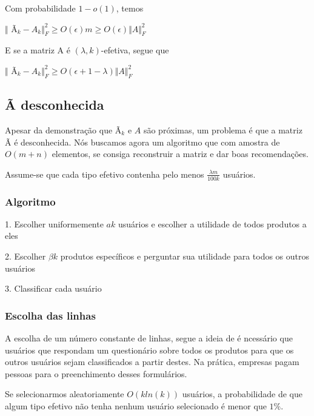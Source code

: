 \documentclass[a4paper,10pt]{article}
\begin{document}
\begin{coro} Com probabilidade $1- o(1)$, temos 

$\Vert$ Ã$_k - A_k\Vert^2_F \geq O(\epsilon)m \geq O(\epsilon)\Vert A \Vert^2_F $
\end{coro}

\begin{coro}
E se a matriz A é $(\lambda, k)$-efetiva, segue que 

$\Vert$ Ã$_k - A_k\Vert^2_F \geq  O(\epsilon + 1 - \lambda)\Vert A \Vert^2_F $
\end{coro}

\subsection{Ã desconhecida}

Apesar da demonstração que Ã$_k$ e $A$ são próximas, um problema é que a
matriz Ã é desconhecida. Nós buscamos agora um algoritmo que com amostra de
$O(m+n)$ elementos, se consiga reconstruir a matriz e dar boas recomendações.

Assume-se que cada tipo efetivo contenha pelo menos $\frac{\lambda m}{100k}$ usuários.

\subsubsection{Algoritmo}

1. Escolher uniformemente $ak$ usuários e escolher a utilidade de todos produtos a eles

2. Escolher $\beta k$ produtos específicos e perguntar sua utilidade para todos os outros usuários

3. Classificar cada usuário

\subsubsection{Escolha das linhas}

A escolha de um número constante de linhas, segue a ideia de é ncessário que
usuários que respondam um questionário sobre todos os produtos para que os
outros usuários sejam classificados a partir destes. Na prática, empresas
pagam pessoas para o preenchimento desses formulários.

\begin{lema}
Se selecionarmos aleatoriamente $O(k ln (k) )$ usuários, a probabilidade
de que algum tipo efetivo não tenha nenhum usuário selecionado é menor que $1\%$.
\end{lema}
\end{document}
